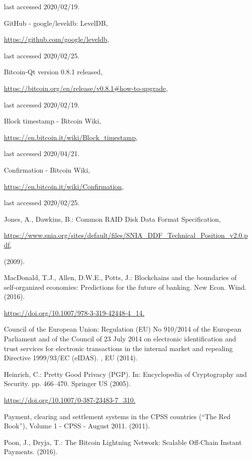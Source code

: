 \begin{multicols}{2}
\begin{thebibliography}{99}
last accessed 2020/02/19.

	GitHub - google/leveldb: LevelDB, 

\url{https://github.com/google/leveldb},

last accessed 2020/02/25.

 Bitcoin-Qt version 0.8.1 released, 

\url{https://bitcoin.org/en/release/v0.8.1\#how-to-upgrade},

 last accessed 2020/02/19.

 Block timestamp - Bitcoin Wiki, 

\url{https://en.bitcoin.it/wiki/Block\_timestamp},

last accessed 2020/04/21.

 Confirmation - Bitcoin Wiki, 

\url{https://en.bitcoin.it/wiki/Confirmation},

last accessed 2020/02/25.

 Jones, A., Dawkins, B.: Common RAID Disk Data Format Specification, 

\url{https://www.snia.org/sites/default/files/SNIA\_DDF\_Technical\_Position\_v2.0.pdf,}

(2009).

 MacDonald, T.J., Allen, D.W.E., Potts, J.: Blockchains and the boundaries of self-organized economies: Predictions for the future of banking. New Econ. Wind. (2016). 

\url{https://doi.org/10.1007/978-3-319-42448-4\_14.}

 Council of the European Union: Regulation (EU) No 910/2014 of the European Parliament and of the Council of 23 July 2014 on electronic identification and trust services for electronic transactions in the internal market and repealing Directive 1999/93/EC (eIDAS). , EU (2014).

 Heinrich, C.: Pretty Good Privacy (PGP). In: Encyclopedia of Cryptography and Security. pp. 466–470. Springer US (2005). 

\url{https://doi.org/10.1007/0-387-23483-7\_310.}

 Payment, clearing and settlement systems in the CPSS countries (“The Red Book”), Volume 1 - CPSS - August 2011. (2011).

 Poon, J., Dryja, T.: The Bitcoin Lightning Network: Scalable Off-Chain Instant Payments. (2016).


\end{thebibliography}
\end{multicols}
